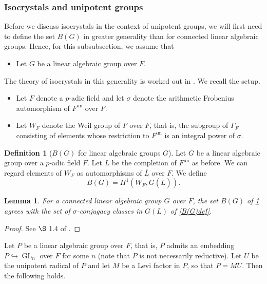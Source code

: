 \documentclass[11pt,a4paper]{article}
\theoremstyle{definition}
\newtheorem{D}[shared]{Definition}
\theoremstyle{plain}
\newtheorem{Le}[shared]{Lemma}
\theoremstyle{remark}
\theoremstyle{plain}
\DeclareMathOperator{\GL}{GL}
\begin{document}
\subsubsection{Isocrystals and unipotent groups}

Before we discuss isocrystals in the context of unipotent groups, we will first need to define the set $B(G)$ in greater generality than for connected linear algebraic groups. Hence, for this subsubsection, we assume that
\begin{itemize}
    \item Let $G$ be a linear algebraic group over $F$.
\end{itemize}
The theory of isocrystals in this generality is worked out in \cite{MR1485921}. We recall the setup.

\begin{itemize}
    \item Let $F$ denote a $p$-adic field and let $\sigma$ denote the arithmetic Frobenius automorphism of $F^{\text{un}}$ over $F$.
    \item Let $W_F$ denote the Weil group of $\overline{F}$ over $F$, that is, the subgroup of $\Gamma_F$ consisting of elements whose restriction to $F^{\text{un}}$ is an integral power of $\sigma$.
\end{itemize}

\begin{D}[$B(G)$ for linear algebraic groups $G$]\label{generalBG}
    Let $G$ be a linear algebraic group over a $p$-adic field $F$. Let $L$ be the completion of $F^{\text{un}}$ as before. We can regard elements of $W_F$ as automorphisms of $\overline{L}$ over $F$. We define
    $$ B(G) = H^1(W_F, G(\overline{L})).$$
\end{D}

\begin{Le}\label{generalBGagrees}
    For a connected linear algebraic group $G$ over $F$, the set $B(G)$ of \ref{generalBG} agrees with the set of $\sigma$-conjugacy classes in $G(L)$ of \ref{B(G)def}.
\end{Le}
\begin{proof}
    See $\S$ 1.4 of \cite{MR1485921}.
\end{proof}

Let $P$ be a linear algebraic group over $F$, that is, $P$ admits an embedding $P \hookrightarrow \GL_n$ over $F$ for some $n$ (note that $P$ is not necessarily reductive). Let $U$ be the unipotent radical of $P$ and let $M$ be a Levi factor in $P$, so that $P=MU$. Then the following holds.
\end{document}
